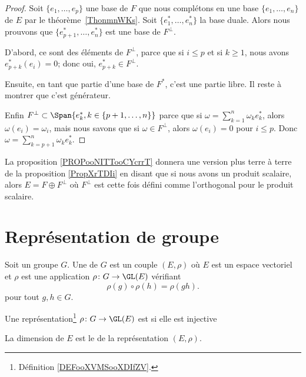 \begin{proof}
	Soit \( \{ e_1,\ldots, e_p \}\) une base de \( F\) que nous complétons en une base \( \{ e_1,\ldots, e_n \}\) de \( E\) par le théorème~\ref{ThonmnWKs}. Soit \( \{ e_1^*,\ldots, e^*_n \}\) la base duale. Alors nous prouvons que \( \{ e^*_{p+1},\ldots, e_n^* \}\) est une base de \( F^{\perp}\).

	D'abord, ce sont des éléments de \( F^{\perp}\), parce que si \( i\leq p\) et si \( k\geq 1\), nous avons \( e^*_{p+k}(e_i)=0\); donc oui, \( e^*_{p+k}\in F^{\perp}\).

	Ensuite, en tant que partie d'une base de \( F^*\), c'est une partie libre. Il reste à montrer que c'est générateur.


	Enfin \( F^{\perp}\subset\Span\{ e_{k}^*, k \in \{p+1, \dots, n\}\}\) parce que si \( \omega=\sum_{k=1}^n\omega_ke_k^*\), alors \( \omega(e_i)=\omega_i\), mais nous savons que si \( \omega\in F^{\perp}\), alors \( \omega(e_i)=0\) pour \( i\leq p\). Donc \( \omega=\sum_{k=p+1}^n\omega_ke^*_k\).
\end{proof}

La proposition \ref{PROPooNITTooCYcrrT} donnera une version plus terre à terre de la proposition \ref{PropXrTDIi} en disant que si nous avons un produit scalaire, alors \( E=F\oplus F^{\perp}\) où \( F^{\perp}\) est cette fois défini comme l'orthogonal pour le produit scalaire.

\section{Représentation de groupe}

\begin{definition}[Représentation]      \label{DEFooXVMSooXDIfZV}
	Soit un groupe \( G\). Une  de \( G\) est un couple \( (E,\rho)\) où \( E\) est un espace vectoriel et \( \rho\) est une application \( \rho\colon G\to \GL(E)\) vérifiant
	\begin{equation}
		\rho(g)\circ\rho(h)=\rho(gh).
	\end{equation}
	pour tout \( g,h\in G\).
\end{definition}

\begin{definition}
	Une représentation\footnote{Définition \ref{DEFooXVMSooXDIfZV}.} \( \rho\colon G\to \GL(E)\) est  si elle est injective 

    La dimension de \( E\) est le  de la représentation \( (E,\rho)\).
\end{definition}

